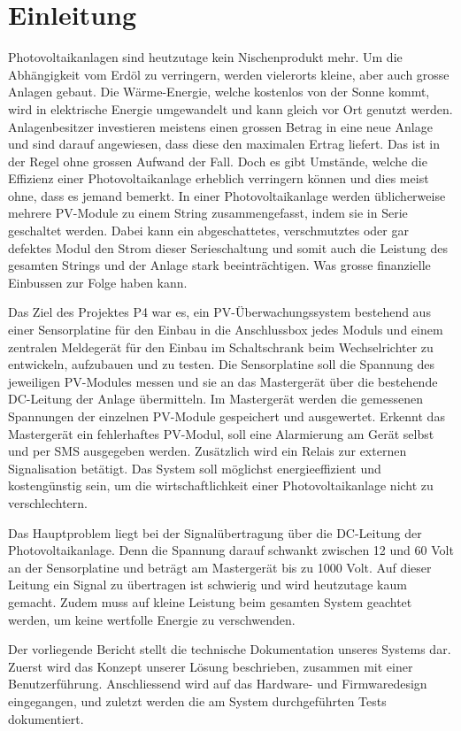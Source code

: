 \chapter{Einleitung}
\label{chap:einleitung}

Photovoltaikanlagen   sind  heutzutage   kein   Nischenprodukt  mehr. Um   die
Abhängigkeit  vom Erdöl  zu verringern,  werden vielerorts  kleine, aber  auch
grosse  Anlagen gebaut. Die  W\"arme-Energie, welche  kostenlos von  der Sonne
kommt,  wird  in elektrische  Energie  umgewandelt  und  kann gleich  vor  Ort
genutzt werden. Anlagenbesitzer  investieren meistens einen grossen  Betrag in
eine  neue  Anlage  und  sind  darauf angewiesen,  dass  diese  den  maximalen
Ertrag  liefert. Das ist  in der  Regel  ohne grossen  Aufwand der  Fall. Doch
es  gibt Umstände,  welche  die Effizienz  einer Photovoltaikanlage  erheblich
verringern  können und  dies meist  ohne, dass  es jemand  bemerkt.  In  einer
Photovoltaikanlage  werden üblicherweise  mehrere  PV-Module  zu einem  String
zusammengefasst,  indem  sie  in   Serie  geschaltet  werden. Dabei  kann  ein
abgeschattetes,  verschmutztes  oder  gar  defektes  Modul  den  Strom  dieser
Serieschaltung und somit auch die Leistung des gesamten Strings und der Anlage
stark beeinträchtigen. Was grosse finanzielle Einbussen zur Folge haben kann.

Das  Ziel des  Projektes P4  war es,  ein PV-Überwachungssystem  bestehend aus
einer Sensorplatine für den Einbau in  die Anschlussbox jedes Moduls und einem
zentralen Meldegerät  für den Einbau  im Schaltschrank beim  Wechselrichter zu
entwickeln, aufzubauen und zu testen. Die  Sensorplatine soll die Spannung des
jeweiligen PV-Modules  messen und sie  an das Mastergerät über  die bestehende
DC-Leitung  der  Anlage  übermitteln. Im  Mastergerät  werden  die  gemessenen
Spannungen der  einzelnen PV-Module  gespeichert und  ausgewertet. Erkennt das
Mastergerät ein fehlerhaftes  PV-Modul, soll eine Alarmierung  am Gerät selbst
und  per  SMS  ausgegeben  werden. Zusätzlich wird  ein  Relais  zur  externen
Signalisation  betätigt.   Das  System  soll  möglichst  energieeffizient  und
kostengünstig sein,  um die wirtschaftlichkeit einer  Photovoltaikanlage nicht
zu verschlechtern.

Das  Hauptproblem liegt  bei  der Signalübertragung  über  die DC-Leitung  der
Photovoltaikanlage. Denn die Spannung darauf schwankt  zwischen 12 und 60 Volt
an der Sensorplatine  und beträgt am Mastergerät bis zu  1000 Volt. Auf dieser
Leitung  ein Signal  zu  übertragen  ist schwierig  und  wird heutzutage  kaum
gemacht.  Zudem muss auf kleine Leistung beim gesamten System geachtet werden,
um keine wertfolle Energie zu verschwenden.


Der vorliegende  Bericht stellt  die technische Dokumentation  unseres Systems
dar.  Zuerst wird das Konzept unserer L\"osung beschrieben, zusammen mit einer
Benutzerf\"uhrung.  Anschliessend  wird auf  das Hardware-  und Firmwaredesign
eingegangen,  und   zuletzt  werden  die  am   System  durchgef\"uhrten  Tests
dokumentiert.
